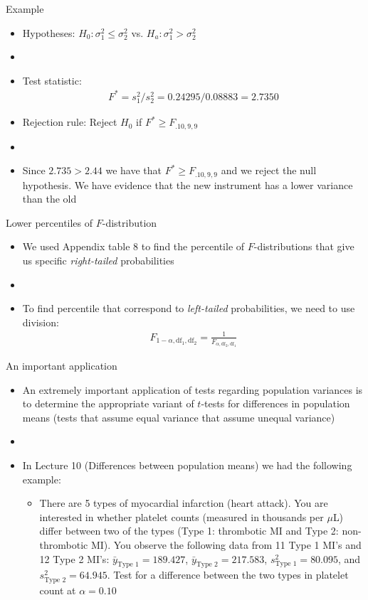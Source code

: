 \documentclass[xcolor=dvipsnames]{beamer}
\begin{document}
\begin{frame}{Example}
	\begin{itemize}
		\item Hypotheses: $H_0: \sigma_1^2 \leq \sigma_2^2$ vs. $H_a: \sigma_1^2 > \sigma_2^2$
		\item[]
		\item Test statistic:
		\begin{gather*}
		F^* = s_1^2 /s_2^2 = 0.24295 /  0.08883 = 2.7350
		\end{gather*}
		\item Rejection rule: Reject $H_0$ if $F^* \geq F_{.10, 9, 9}$ \pause
		\item[]
		\item Since $2.735 > 2.44$ we have that $F^* \geq F_{.10, 9, 9}$ and we reject the null hypothesis. We have evidence that the new instrument has a lower variance than the old
	\end{itemize}
\end{frame}

\begin{frame}{Lower percentiles of $F$-distribution}
	\begin{itemize}
		\item We used Appendix table 8 to find the percentile of $F$-distributions that give us specific \emph{right-tailed} probabilities \pause
		\item[]
		\item To find percentile that correspond to \emph{left-tailed} probabilities, we need to use division: \pause
		\begin{gather*}
			F_{1-\alpha, \text{df}_1, \text{df}_2} = \frac{1}{F_{\alpha, \text{df}_2, \text{df}_1}}
		\end{gather*} 
	\end{itemize}
\end{frame}

\begin{frame}{An important application}
	\begin{itemize}
		\item An extremely important application of tests regarding population variances is to determine the appropriate variant of $t$-tests for differences in population means (tests that assume equal variance that assume unequal variance) \pause
		\item[]
		\item In Lecture 10 (Differences between population means) we had the following example: \pause
		\begin{itemize}
			\item There are 5 types of myocardial infarction (heart attack). You are interested in whether platelet counts (measured in thousands per $\mu$L) differ between two of the types (Type 1: thrombotic MI and Type 2: non-thrombotic MI). You observe the following data from 11 Type 1 MI's and 12 Type 2 MI's: $\bar{y}_{\text{Type 1}}=189.427$, $\bar{y}_{\text{Type 2}}=217.583$, $s_{\text{Type 1}}^2 = 80.095$, and $s_{\text{Type 2}}^2 = 64.945$. Test for a difference between the two types in platelet count at $\alpha = 0.10$
		\end{itemize}
	\end{itemize}
\end{frame}
\end{document}
